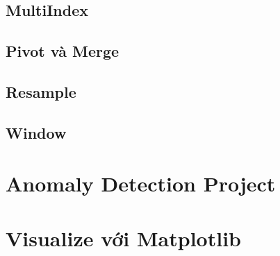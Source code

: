 \documentclass[
]{book}
\begin{document}
\hypertarget{multiindex}{%
\section{MultiIndex}\label{multiindex}}

\hypertarget{pivot-vuxe0-merge}{%
\section{Pivot và Merge}\label{pivot-vuxe0-merge}}

\hypertarget{resample}{%
\section{Resample}\label{resample}}

\hypertarget{window}{%
\section{Window}\label{window}}

\hypertarget{anomaly-detection-project}{%
\chapter{Anomaly Detection Project}\label{anomaly-detection-project}}

\hypertarget{visualize-vux1edbi-matplotlib}{%
\chapter{Visualize với Matplotlib}\label{visualize-vux1edbi-matplotlib}}

\printindex
\end{document}
